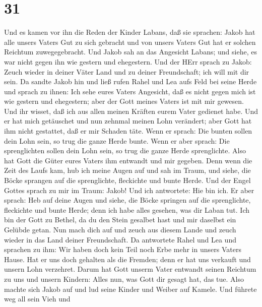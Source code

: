 \hypertarget{section-30}{%
\section{31}\label{section-30}}

 Und es kamen vor ihn die Reden der Kinder Labans, daß sie
sprachen: Jakob hat alle unsers Vaters Gut zu sich gebracht und von
unsers Vaters Gut hat er solchen Reichtum zuwegegebracht. 
Und Jakob sah an das Angesicht Labans; und siehe, es war nicht gegen ihn
wie gestern und ehegestern.  Und der HErr sprach zu Jakob:
Zeuch wieder in deiner Väter Land und zu deiner Freundschaft; ich will
mit dir sein.  Da sandte Jakob hin und ließ rufen Rahel und
Lea aufs Feld bei seine Herde  und sprach zu ihnen: Ich sehe
eures Vaters Angesicht, daß es nicht gegen mich ist wie gestern und
ehegestern; aber der Gott meines Vaters ist mit mir gewesen.
 Und ihr wisset, daß ich aus allen meinen Kräften eurem
Vater gedienet habe.  Und er hat mich getäuschet und nun
zehnmal meinen Lohn verändert; aber Gott hat ihm nicht gestattet, daß er
mir Schaden täte.  Wenn er sprach: Die bunten sollen dein
Lohn sein, so trug die ganze Herde bunte. Wenn er aber sprach: Die
sprenglichten sollen dein Lohn sein, so trug die ganze Herde
sprenglichte.  Also hat Gott die Güter eures Vaters ihm
entwandt und mir gegeben.  Denn wenn die Zeit des Laufs
kam, hub ich meine Augen auf und sah im Traum, und siehe, die Böcke
sprangen auf die sprenglichte, fleckichte und bunte Herde. 
Und der Engel Gottes sprach zu mir im Traum: Jakob! Und ich antwortete:
Hie bin ich.  Er aber sprach: Heb auf deine Augen und
siehe, die Böcke springen auf die sprenglichte, fleckichte und bunte
Herde; denn ich habe alles gesehen, was dir Laban tut.  Ich
bin der Gott zu Bethel, da du den Stein gesalbet hast und mir daselbst
ein Gelübde getan. Nun mach dich auf und zeuch aus diesem Lande und
zeuch wieder in das Land deiner Freundschaft.  Da
antwortete Rahel und Lea und sprachen zu ihm: Wir haben doch kein Teil
noch Erbe mehr in unsers Vaters Hause.  Hat er uns doch
gehalten als die Fremden; denn er hat uns verkauft und unsern Lohn
verzehret.  Darum hat Gott unserm Vater entwandt seinen
Reichtum zu uns und unsern Kindern: Alles nun, was Gott dir gesagt hat,
das tue.  Also machte sich Jakob auf und lud seine Kinder
und Weiber auf Kamele.  Und führete weg all sein Vieh und
